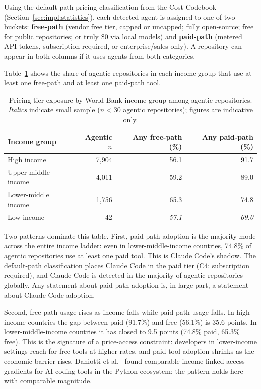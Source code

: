 Using the default-path pricing classification from the Cost Codebook (Section~\ref{sec:impl:statistics}), each detected agent is assigned to one of two buckets: \textbf{free-path} (vendor free tier, capped or uncapped; fully open-source; free for public repositories; or truly \$0 via local models) and \textbf{paid-path} (metered API tokens, subscription required, or enterprise/sales-only). A repository can appear in both columns if it uses agents from both categories.

Table~\ref{tab:pricing} shows the share of agentic repositories in each income group that use at least one free-path and at least one paid-path tool.

\begin{table}[h]
\centering
\caption{Pricing-tier exposure by World Bank income group among agentic repositories.
         \textit{Italics} indicate small sample ($n < 30$ agentic repositories); figures are indicative only.}
\label{tab:pricing}
\begin{tabular}{@{}lrrr@{}}
\toprule
Income group & Agentic $n$ & Any free-path (\%) & Any paid-path (\%) \\
\midrule
High income          & 7,904 & 56.1 & 91.7 \\
Upper-middle income  & 4,011 & 59.2 & 89.0 \\
Lower-middle income  & 1,756 & 65.3 & 74.8 \\
Low income           &    42 & \textit{57.1} & \textit{69.0} \\
\bottomrule
\end{tabular}
\end{table}

Two patterns dominate this table. First, paid-path adoption is the majority mode across the entire income ladder: even in lower-middle-income countries, 74.8\% of agentic repositories use at least one paid tool. This is Claude Code's shadow. The default-path classification places Claude Code in the paid tier (C4: subscription required), and Claude Code is detected in the majority of agentic repositories globally. Any statement about paid-path adoption is, in large part, a statement about Claude Code adoption.

Second, free-path usage rises as income falls while paid-path usage falls. In high-income countries the gap between paid (91.7\%) and free (56.1\%) is 35.6 points. In lower-middle-income countries it has closed to 9.5 points (74.8\% paid, 65.3\% free). This is the signature of a price-access constraint: developers in lower-income settings reach for free tools at higher rates, and paid-tool adoption shrinks as the economic barrier rises. Daniotti et al.~\cite{daniotti2025} found comparable income-linked access gradients for AI coding tools in the Python ecosystem; the pattern holds here with comparable magnitude.

